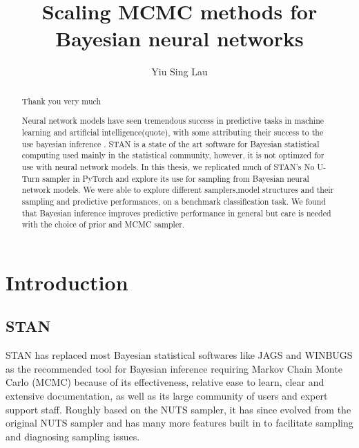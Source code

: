\documentclass[12pt]{report}
\title{Scaling MCMC methods for Bayesian neural networks}
\author{Yiu Sing Lau}
\date{}
\begin{document}
\maketitle

\renewcommand{\abstractname}{ACKNOWLEDGEMENTS}
\begin{abstract}
Thank you very much

\end{abstract}

\renewcommand{\abstractname}{ABSTRACT}

\begin{abstract}
Neural network models have seen tremendous success in predictive tasks in machine learning and artificial intelligence(quote), with some attributing their success to the use bayesian inference \cite{mandt2017stochastic}. STAN is a state of the art software for Bayesian statistical computing used mainly in the statistical community, however, it is not optimzed for use with neural network models. In this thesis, we replicated much of STAN's No U-Turn sampler in PyTorch and explore its use for sampling from Bayesian neural network models. We were able to explore different samplers,model structures and their sampling and predictive performances, on a benchmark classification task. We found that Bayesian inference improves predictive performance in general but care is needed with the choice of prior and MCMC sampler. 

\end{abstract}
\tableofcontents 

\chapter{Introduction}
\section{STAN}

STAN has replaced most Bayesian statistical softwares like JAGS and WINBUGS as the recommended tool for Bayesian inference requiring Markov Chain Monte Carlo (MCMC)  because of its effectiveness, relative ease to learn, clear and extensive documentation, as well as its large community of users and expert support staff. Roughly based on the NUTS sampler, it has since evolved from the original NUTS sampler and has many more features built in to facilitate sampling and diagnosing sampling issues.
\end{document}
